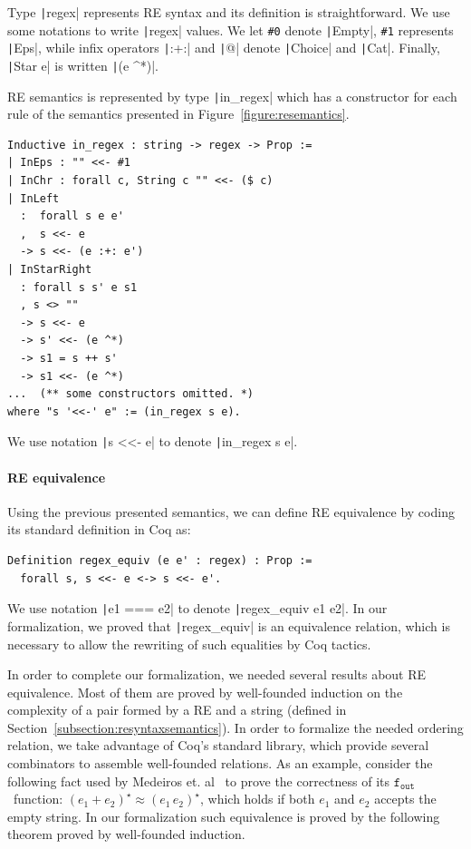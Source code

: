 \documentclass[review]{elsarticle}
\newcommand{\fout}{\ensuremath{\texttt{f$_{\texttt{out}}$}}}
\newcommand{\coq}[1]{\texttt|#1|}
\theoremstyle{definition}
\begin{document}
Type \coq{regex} represents RE syntax and its definition is straightforward.
We use some notations to write \coq{regex} values. We let \verb|#0| denote
\coq{Empty}, \verb|#1| represents \coq{Eps}, while infix operators \coq{:+:} and
\coq{@} denote \coq{Choice} and \coq{Cat}. Finally, \coq{Star e} is
written \coq{(e ^*)}.

RE semantics is represented by type \coq{in_regex} which has a constructor for each
rule of the semantics presented in Figure~\ref{figure:resemantics}.

\begin{verbatim}
Inductive in_regex : string -> regex -> Prop :=
| InEps : "" <<- #1
| InChr : forall c, String c "" <<- ($ c)
| InLeft
  :  forall s e e'
  ,  s <<- e
  -> s <<- (e :+: e')
| InStarRight              
  : forall s s' e s1 
  , s <> ""  
  -> s <<- e
  -> s' <<- (e ^*)
  -> s1 = s ++ s'
  -> s1 <<- (e ^*)
...  (** some constructors omitted. *)
where "s '<<-' e" := (in_regex s e).
\end{verbatim}
We use notation \coq{s <<- e} to denote \coq{in_regex s e}.

\paragraph{RE equivalence} Using the previous presented semantics, we can define
RE equivalence by coding its standard definition in Coq as:
\begin{verbatim}
Definition regex_equiv (e e' : regex) : Prop :=
  forall s, s <<- e <-> s <<- e'.
\end{verbatim}
We use notation \coq{e1 === e2} to denote \coq{regex_equiv e1 e2}. In our
formalization, we proved that \coq{regex_equiv} is an equivalence relation,
which is necessary to allow the rewriting of such equalities by Coq
tactics.

In order to complete our formalization, we needed several results about RE
equivalence. Most of them are proved by well-founded induction on the complexity
of a pair formed by a RE and a string (defined in Section~\ref{subsection:resyntaxsemantics}).
In order to formalize the needed ordering relation, we take advantage of Coq's
standard library, which provide several combinators to assemble well-founded
relations. As an example, consider the following fact used by Medeiros et. al~\cite{Medeiros14} to
prove the correctness of its \fout~function: $(e_1 + e_2)^\star \approx
(e_1\,e_2)^\star$, which holds if both $e_1$ and $e_2$ accepts the empty string.
In our formalization such equivalence is proved by the following theorem proved
by well-founded induction.
\end{document}
